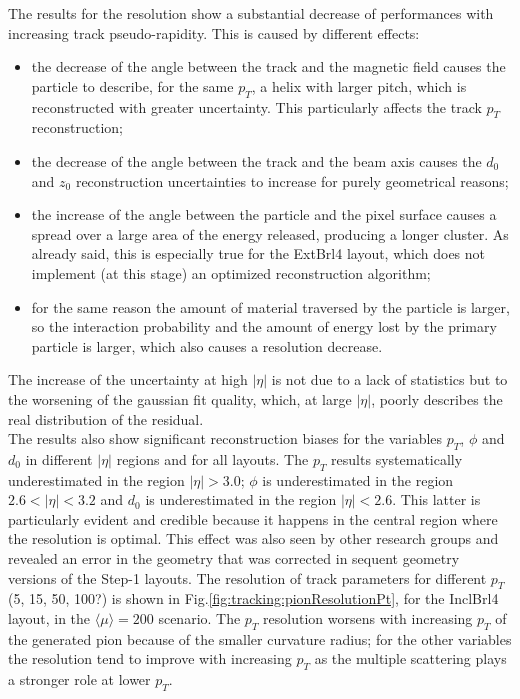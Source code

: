 \documentclass[a4paper,twoside,12pt]{book}
\begin{document}
The results for the resolution show a substantial decrease of performances with increasing track pseudo-rapidity. This is caused by different effects: 

\begin{itemize}
\item the decrease of the angle between  the track and the magnetic field causes the particle to describe, for the same $p_{T}$, a helix with larger pitch,
	which is reconstructed with greater uncertainty. This particularly affects the track $p_{T}$ reconstruction;
\item the decrease of the angle between the track and the beam axis causes the $d_{0}$ and $z_{0}$ reconstruction uncertainties to increase for purely geometrical reasons;
\item the increase of the angle between the particle and the pixel surface causes a spread over a large area of the energy released, producing a longer cluster. As already
said, this is especially true for the ExtBrl4 layout, which does not implement (at this stage) an optimized reconstruction algorithm;
\item for the same reason the amount of material traversed by the particle is larger, so the interaction probability and the amount of energy lost by the primary particle is larger, which also causes a resolution decrease.
\end{itemize}

The increase of the uncertainty at high $|\eta|$ is not due to a lack of statistics but to the
worsening of the gaussian fit quality, which, at large $|\eta|$, poorly describes the real distribution of the residual.\\

The results also show significant reconstruction biases for the variables $p_{T}$, $\phi$ and $d_{0}$ in different $|\eta|$ regions and for all layouts. The $p_{T}$ results systematically underestimated in the region
$|\eta| > 3.0$; 	$\phi$ is underestimated in the region $2.6 < |\eta| < 3.2$ and $d_{0}$  is underestimated in the region $|\eta| < 2.6$. This latter is particularly evident and credible because
it happens in the central region where the resolution is optimal. This effect was also seen by other research groups and revealed an error in the geometry that was corrected in sequent geometry versions of the Step-1 layouts.  
The resolution of track parameters for different $p_{T}$ (5, 15, 50, 100?) is shown in Fig.\ref{fig:tracking:pionResolutionPt}, for the InclBrl4 layout, in the $\langle\mu\rangle = 200$ scenario. The $p_{T}$ resolution worsens with
increasing $p_{T}$ of the generated pion because of the smaller curvature radius; 
for the other variables the resolution tend to improve with increasing $p_{T}$ as the 
multiple scattering plays a stronger role at lower $p_{T}$.\\ 
\end{document}
